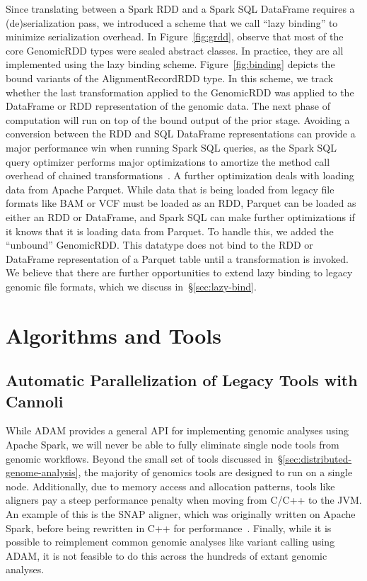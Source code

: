 \documentclass[phd]{ucbthesis}
\begin{document}
Since translating between a {Spark} RDD and a {Spark SQL}
DataFrame requires a (de)ser\-ializa\-tion pass, we introduced a scheme that we call
``lazy binding'' to minimize serialization overhead. In Figure~\ref{fig:grdd},
observe that most of the core {GenomicRDD} types were
sealed abstract classes. In practice, they are all implemented using the lazy
binding scheme. Figure~\ref{fig:binding} depicts the bound variants of the
{AlignmentRecordRDD} type. In this scheme, we track whether the last
transformation applied to the {GenomicRDD} was applied to the DataFrame
or RDD representation of the genomic data. The next phase of computation will
run on top of the bound output of the prior stage. Avoiding a conversion between the RDD and SQL DataFrame representations can provide a major
performance win when running {Spark SQL} queries, as the {Spark SQL}
query optimizer performs major optimizations to amortize the method call
overhead of chained transformations~\cite{armbrust15}. A further optimization
deals with loading data from {Apache Parquet}. While data that is being
loaded from legacy file formats like BAM or VCF must be loaded as an RDD,
{Parquet} can be loaded as either an RDD or DataFrame, and {Spark
  SQL} can make further optimizations if it knows that it is loading data from
{Parquet}. To handle this, we added the ``unbound'' {GenomicRDD}.
This datatype does not bind to the RDD or DataFrame representation of a
{Parquet} table until a transformation is invoked. We believe that there
are further opportunities to extend lazy binding to legacy genomic file formats,
which we discuss in~\S\ref{sec:lazy-bind}.

\part{Algorithms and Tools}

\chapter{Automatic Parallelization of Legacy Tools with {Cannoli}}
\label{chap:cannoli}

While {ADAM} provides a general API for implementing genomic analyses
using {Apache Spark}, we will never be able to fully eliminate single
node tools from genomic workflows. Beyond the small set of tools discussed
in~\S\ref{sec:distributed-genome-analysis}, the majority of genomics tools are
designed to run on a single node. Additionally, due to memory access and
allocation patterns, tools like aligners pay a steep performance penalty when
moving from C/C++ to the JVM. An example of this is the {SNAP} aligner,
which was originally written on {Apache Spark}, before being rewritten in
C++ for performance~\cite{zaharia11}. Finally, while it is possible to
reimplement common genomic analyses like variant calling using {ADAM}, it
is not feasible to do this across the hundreds of extant genomic analyses.
\end{document}
